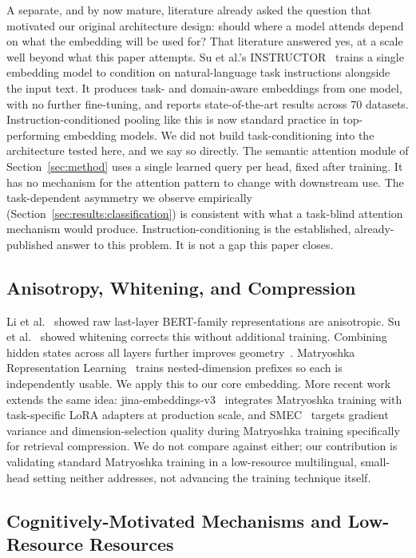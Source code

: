 \documentclass[manuscript]{acmart}
\begin{document}
A separate, and by now mature, literature already asked the question that motivated our original architecture design: should where a model attends depend on what the embedding will be used for? That literature answered yes, at a scale well beyond what this paper attempts. Su et al.'s INSTRUCTOR~\citep{su2022instructor} trains a single embedding model to condition on natural-language task instructions alongside the input text. It produces task- and domain-aware embeddings from one model, with no further fine-tuning, and reports state-of-the-art results across 70 datasets. Instruction-conditioned pooling like this is now standard practice in top-performing embedding models. We did not build task-conditioning into the architecture tested here, and we say so directly. The semantic attention module of Section~\ref{sec:method} uses a single learned query per head, fixed after training. It has no mechanism for the attention pattern to change with downstream use. The task-dependent asymmetry we observe empirically (Section~\ref{sec:results:classification}) is consistent with what a task-blind attention mechanism would produce. Instruction-conditioning is the established, already-published answer to this problem. It is not a gap this paper closes.

\subsection{Anisotropy, Whitening, and Compression}

Li et al.~\citep{li2020bertflow} showed raw last-layer BERT-family representations are anisotropic. Su et al.~\citep{su2021whitening} showed whitening corrects this without additional training. Combining hidden states across all layers further improves geometry~\citep{hosseini2023layercombination}. Matryoshka Representation Learning~\citep{kusupati2022mrl} trains nested-dimension prefixes so each is independently usable. We apply this to our core embedding. More recent work extends the same idea: jina-embeddings-v3~\citep{sturua2024jinav3} integrates Matryoshka training with task-specific LoRA adapters at production scale, and SMEC~\citep{zhang2025smec} targets gradient variance and dimension-selection quality during Matryoshka training specifically for retrieval compression. We do not compare against either; our contribution is validating standard Matryoshka training in a low-resource multilingual, small-head setting neither addresses, not advancing the training technique itself.

\subsection{Cognitively-Motivated Mechanisms and Low-Resource Resources}
\end{document}
